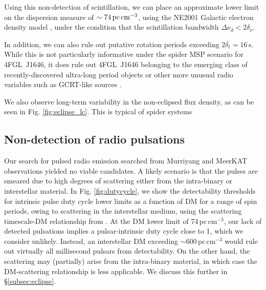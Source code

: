 \documentclass[fleqn,usenatbib]{mnras}
\newcommand{\blinky}{{4FGL}~J1646}
\begin{document}
Using this non-detection of scintillation, we can place an approximate lower limit on the dispersion measure of $\sim 74\,{\rm pc}\,{\rm cm}^{-3}$, using the NE2001 Galactic electron density model \citep{2002astro.ph..7156C}, under the condition that the scintillation bandwidth $\Delta \nu_d < 2\delta_\nu$. %

In addition, we can also rule out putative rotation periods exceeding $2\delta_t=16$\,s. While this is not particularly informative under the spider MSP scenario for \blinky{}, it does rule out \blinky{} belonging to the emerging class of recently-discovered ultra-long period objects \citep{2022Natur.601..526H,2022NatAs...6..828C,2023Natur.619..487H} or other more unusual radio variables such as GCRT-like sources \citep{2021ApJ...920...45W,2005Natur.434...50H}.

We also observe long-term variability in the non-eclipsed flux density, as can be seen in Fig. \ref{fig:eclipse_lc}. This is typical of spider systems \citep{2023ApJ...942...87K,2020MNRAS.494.2948P}

\subsection{Non-detection of radio pulsations}

Our search for pulsed radio emission searched from Murriyang and MeerKAT observations yielded no viable candidates.
A likely scenario is that the pulses are smeared due to high degrees of scattering either from the intra-binary or interstellar material. In Fig. \ref{fig:dutycycle}, we show the detectability thresholds for intrinsic pulse duty cycle lower limits as a function of DM for a range of spin periods, owing to scattering in the interstellar medium, using the scattering timescale-DM relationship from \citet{2004ApJ...605..759B}. At the DM lower limit of 74\,pc\,cm$^{-3}$, our lack of detected pulsations implies a pulsar-intrinsic duty cycle close to 1, which we consider unlikely. Instead, an interstellar DM exceeding $\sim 600$\,pc\,cm$^{-3}$ would rule out virtually all millisecond pulsars from detectability. On the other hand, the scattering may (partially) arise from the intra-binary material, in which case the DM-scattering relationship is less applicable. We discuss this further in \S \ref{subsec:eclipse}.
\end{document}
